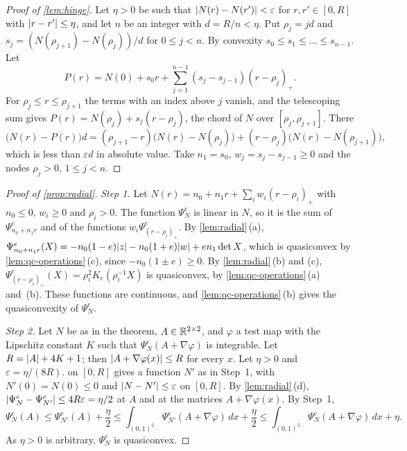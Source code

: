 \begin{proof}[Proof of \cref{lem:hinge}]
Let $\eta>0$ be such that $\lvert N(r)-N(r')\rvert<\varepsilon$ for $r,r'\in[0,R]$ with
$\lvert r-r'\rvert\le\eta$, and let $n$ be an integer with $d=R/n<\eta$. Put $\rho_j=jd$ and
$s_j=(N(\rho_{j+1})-N(\rho_j))/d$ for $0\le j<n$. By convexity $s_0\le s_1\le\dots\le s_{n-1}$.
Let
\[
  P(r)=N(0)+s_0r+\sum_{j=1}^{n-1}(s_j-s_{j-1})(r-\rho_j)_+ .
\]
For $\rho_j\le r\le\rho_{j+1}$ the terms with an index above $j$ vanish, and the telescoping sum
gives $P(r)=N(\rho_j)+s_j(r-\rho_j)$, the chord of $N$ over $[\rho_j,\rho_{j+1}]$. There
\[
  \bigl(N(r)-P(r)\bigr)d=(\rho_{j+1}-r)\bigl(N(r)-N(\rho_j)\bigr)+(r-\rho_j)\bigl(N(r)
  -N(\rho_{j+1})\bigr),
\]
which is less than $\varepsilon d$ in absolute value. Take $n_1=s_0$, $w_j=s_j-s_{j-1}\ge0$
and the nodes $\rho_j>0$, $1\le j<n$.
\end{proof}

\begin{proof}[Proof of \cref{prop:radial}]
\emph{Step 1.} Let $N(r)=n_0+n_1r+\sum_iw_i(r-\rho_i)_+$ with $n_0\le0$, $w_i\ge0$ and
$\rho_i>0$. The function $\Psi^e_N$ is linear in $N$, so it is the sum of
$\Psi^e_{n_0+n_1r}$ and of the functions $w_i\Psi^e_{(r-\rho_i)_+}$. By
\cref{lem:radial}\,(a),
$\Psi^e_{n_0+n_1r}(X)=-n_0(1-e)\lvert z\rvert-n_0(1+e)\lvert w\rvert+en_1\det X$, which is quasiconvex by
\cref{lem:qc-operations}\,(c), since $-n_0(1\pm e)\ge0$. By \cref{lem:radial}\,(b) and (c),
$\Psi^e_{(r-\rho_i)_+}(X)=\rho_i^2K_e(\rho_i^{-1}X)$ is quasiconvex, by
\cref{lem:qc-operations}\,(a) and~(b). These functions are continuous, and
\cref{lem:qc-operations}\,(b) gives the quasiconvexity of $\Psi^e_N$.

\emph{Step 2.} Let $N$ be as in the theorem, $A\in\mathbb{R}^{2\times 2}$, and $\varphi$ a test map with the
Lipschitz constant $K$ such that $\Psi^e_N(A+\nabla\varphi)$ is integrable. Let
$R=\lvert A\rvert+4K+1$; then $\lvert A+\nabla\varphi(x)\rvert\le R$ for every $x$. Let $\eta>0$ and
$\varepsilon=\eta/(8R)$.  on $[0,R]$ gives a function $N'$ as in Step~1, with
$N'(0)=N(0)\le0$ and $\lvert N-N'\rvert\le\varepsilon$ on $[0,R]$. By \cref{lem:radial}\,(d),
$\lvert \Psi^e_N-\Psi^e_{N'}\rvert\le4R\varepsilon=\eta/2$ at $A$ and at the matrices
$A+\nabla\varphi(x)$. By Step~1,
\[
  \Psi^e_N(A)\le\Psi^e_{N'}(A)+\frac\eta2\le\int_{(0,1)^2}\Psi^e_{N'}(A+\nabla\varphi)\,dx
  +\frac\eta2\le\int_{(0,1)^2}\Psi^e_N(A+\nabla\varphi)\,dx+\eta .
\]
As $\eta>0$ is arbitrary, $\Psi^e_N$ is quasiconvex.
\end{proof}

